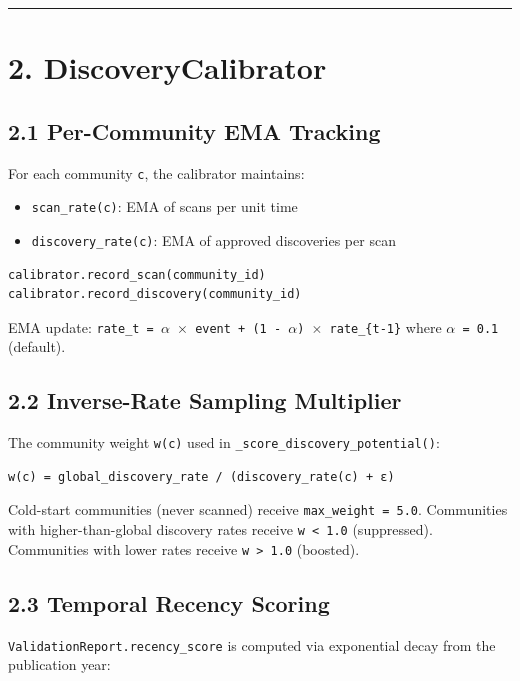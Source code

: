 \medskip\noindent\rule{\linewidth}{0.4pt}\medskip

\section*{2. DiscoveryCalibrator}

\subsection*{2.1 Per-Community EMA Tracking}

For each community \texttt{c}, the calibrator maintains:
\begin{itemize}
  \item \texttt{scan\_rate(c)}: EMA of scans per unit time
  \item \texttt{discovery\_rate(c)}: EMA of approved discoveries per scan
\end{itemize}


\begin{lstlisting}[language=Python]
calibrator.record_scan(community_id)
calibrator.record_discovery(community_id)
\end{lstlisting}

EMA update: \texttt{rate\_t = $\alpha$ $\times$ event + (1 - $\alpha$) $\times$ rate\_\{t-1\}} where \texttt{$\alpha$ = 0.1} (default).

\subsection*{2.2 Inverse-Rate Sampling Multiplier}

The community weight \texttt{w(c)} used in \texttt{\_score\_discovery\_potential()}:

\begin{lstlisting}
w(c) = global_discovery_rate / (discovery_rate(c) + ε)
\end{lstlisting}

Cold-start communities (never scanned) receive \texttt{max\_weight = 5.0}. Communities with higher-than-global discovery rates receive \texttt{w < 1.0} (suppressed). Communities with lower rates receive \texttt{w > 1.0} (boosted).

\subsection*{2.3 Temporal Recency Scoring}

\texttt{ValidationReport.recency\_score} is computed via exponential decay from the publication year:

